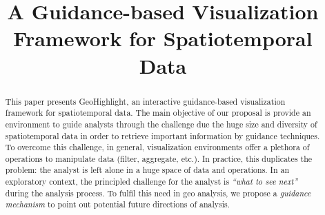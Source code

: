 \documentclass[conference]{IEEEtran}
\newcommand{\sys}{{\sc GeoHighlight}}
\begin{document}
\title{A Guidance-based Visualization Framework for Spatiotemporal Data}


\author{
\and
{}
}

\maketitle


\begin{abstract}
This paper presents \sys, an interactive guidance-based visualization framework for spatiotemporal data. The main objective of our proposal is provide an environment to guide analysts through the challenge due the huge size and diversity of spatiotemporal data in order to retrieve important information by guidance techniques.  To overcome this challenge, in general, visualization environments offer a plethora of operations to manipulate data (filter, aggregate, etc.). In practice, this duplicates the problem: the analyst is left alone in a huge space of data and operations. In an exploratory context, the principled challenge for the analyst is {\em ``what to see next''} during the analysis process. To fulfil this need in geo analysis, we propose a {\em guidance mechanism} to point out potential future directions of analysis. %

\end{abstract}
\end{document}
